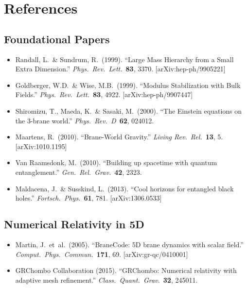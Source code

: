 \section{References}
\label{sec:references}

\subsection*{Foundational Papers}
\begin{itemize}
  \item Randall, L.\ \& Sundrum, R.\ (1999). ``Large Mass Hierarchy from a Small Extra Dimension.'' \textit{Phys.\ Rev.\ Lett.}\ \textbf{83}, 3370. [arXiv:hep-ph/9905221]
  \item Goldberger, W.D.\ \& Wise, M.B.\ (1999). ``Modulus Stabilization with Bulk Fields.'' \textit{Phys.\ Rev.\ Lett.}\ \textbf{83}, 4922. [arXiv:hep-ph/9907447]
  \item Shiromizu, T., Maeda, K.\ \& Sasaki, M.\ (2000). ``The Einstein equations on the 3-brane world.'' \textit{Phys.\ Rev.\ D}\ \textbf{62}, 024012.
  \item Maartens, R.\ (2010). ``Brane-World Gravity.'' \textit{Living Rev.\ Rel.}\ \textbf{13}, 5. [arXiv:1010.1195]
  \item Van Raamsdonk, M.\ (2010). ``Building up spacetime with quantum entanglement.'' \textit{Gen.\ Rel.\ Grav.}\ \textbf{42}, 2323.
  \item Maldacena, J.\ \& Susskind, L.\ (2013). ``Cool horizons for entangled black holes.'' \textit{Fortsch.\ Phys.}\ \textbf{61}, 781. [arXiv:1306.0533]
\end{itemize}

\subsection*{Numerical Relativity in 5D}
\begin{itemize}
  \item Martin, J.\ et~al.\ (2005). ``BraneCode: 5D brane dynamics with scalar field.'' \textit{Comput.\ Phys.\ Commun.}\ \textbf{171}, 69. [arXiv:gr-qc/0410001]
  \item GRChombo Collaboration (2015). ``GRChombo: Numerical relativity with adaptive mesh refinement.'' \textit{Class.\ Quant.\ Grav.}\ \textbf{32}, 245011.
\end{itemize}

